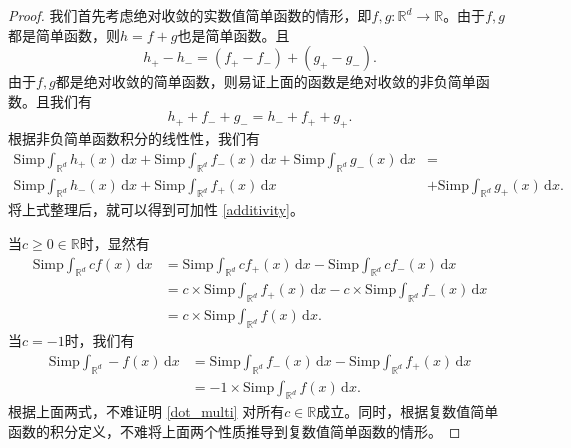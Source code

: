 \documentclass[reqno,a4paper,10pt]{amsart}
\newcommand\dif{\,\mathrm{d}}
\begin{document}
\begin{proof}
    我们首先考虑绝对收敛的实数值简单函数的情形，即$f,g: \mathbb{R}^d\to \mathbb{R}$。由于$f,g$都是简单函数，则$h=f+g$也是简单函数。且
    \begin{equation*}
        h_+ - h_-=(f_+ - f_-)+(g_+ - g_-).
    \end{equation*}
    由于$f,g$都是绝对收敛的简单函数，则易证上面的函数是绝对收敛的非负简单函数。且我们有
    \begin{equation}
        h_+ + f_- + g_- = h_- + f_+ + g_+.
        \label{equivalence}
    \end{equation}
    根据非负简单函数积分的线性性，我们有
    \begin{equation*}
        \begin{split}
            \mathrm{Simp}\int_{\mathbb{R}^d} h_+(x)\dif x + \mathrm{Simp}\int_{\mathbb{R}^d} f_-(x)\dif x +\mathrm{Simp}\int_{\mathbb{R}^d} g_-(x)\dif x &=\\
            \mathrm{Simp}\int_{\mathbb{R}^d} h_-(x)\dif x + \mathrm{Simp}\int_{\mathbb{R}^d} f_+(x)\dif x &+ \mathrm{Simp}\int_{\mathbb{R}^d} g_+(x)\dif x.
        \end{split}
    \end{equation*}
    将上式整理后，就可以得到可加性 \eqref{additivity}。
    
    当$c\geq 0\in\mathbb{R}$时，显然有
    \begin{equation*}
        \begin{split}
            \mathrm{Simp}\int_{\mathbb{R}^d} c f(x)\dif x &= \mathrm{Simp}\int_{\mathbb{R}^d} c f_+(x)\dif x -\mathrm{Simp}\int_{\mathbb{R}^d} c f_-(x)\dif x\\
            &=c\times\mathrm{Simp} \int_{\mathbb{R}^d} f_+(x)\dif x - c\times\mathrm{Simp} \int_{\mathbb{R}^d} f_-(x)\dif x\\
            &=c\times\mathrm{Simp} \int_{\mathbb{R}^d} f(x)\dif x.
        \end{split}
    \end{equation*}
    当$c=-1$时，我们有
    \begin{equation*}
        \begin{split}
            \mathrm{Simp}\int_{\mathbb{R}^d} - f(x)\dif x &= \mathrm{Simp}\int_{\mathbb{R}^d}  f_-(x)\dif x -\mathrm{Simp}\int_{\mathbb{R}^d}  f_+(x)\dif x\\
            &=-1\times\mathrm{Simp} \int_{\mathbb{R}^d} f(x)\dif x.
        \end{split}
    \end{equation*}
    根据上面两式，不难证明 \eqref{dot_multi} 对所有$c\in \mathbb{R}$成立。同时，根据复数值简单函数的积分定义，不难将上面两个性质推导到复数值简单函数的情形。


\end{proof}
\end{document}
